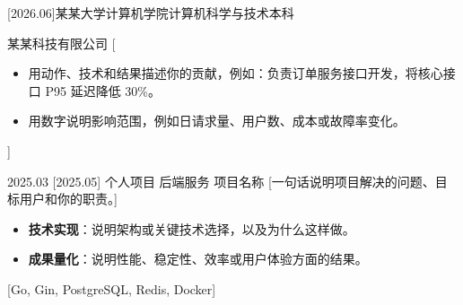 \documentclass[zh,compact]{resume}
\begin{document}
\makeheader

\begin{abstract}
\begin{competences}[4.8em]
\end{competences}
\end{abstract}

\begin{educations}
  [2026.06]{某某大学}{计算机学院}{计算机科学与技术}{本科}
\end{educations}

\begin{experiences}
    {某某科技有限公司 }%
    [\begin{itemize}
      \item 用动作、技术和结果描述你的贡献，例如：负责订单服务接口开发，将核心接口 P95 延迟降低 30\%。
      \item 用数字说明影响范围，例如日请求量、用户数、成本或故障率变化。
    \end{itemize}]
\end{experiences}

\begin{projects}
  \project%
    {2025.03}%
    [2025.05]%
    {个人项目}%
    {后端服务}%
    {项目名称}%
    [一句话说明项目解决的问题、目标用户和你的职责。]%
    {\begin{itemize}
      \item \textbf{技术实现}：说明架构或关键技术选择，以及为什么这样做。
      \item \textbf{成果量化}：说明性能、稳定性、效率或用户体验方面的结果。
    \end{itemize}}%
    [Go, Gin, PostgreSQL, Redis, Docker]
\end{projects}
\end{document}

